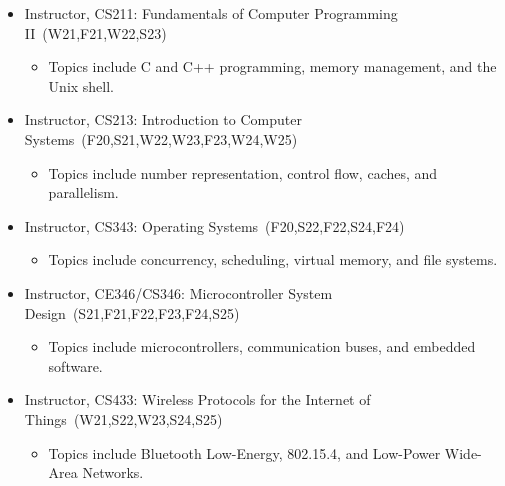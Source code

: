 \documentclass{article}
\begin{document}
\begin{itemize}
  \item[] Instructor, CS211: Fundamentals of Computer Programming II~(W21,F21,W22,S23)
    \vspace{-\topsep}
    \vspace{\itemsep}
    \begin{itemize}
      \item Topics include C and C++ programming, memory management, and the Unix shell.
    \end{itemize}
  \item[] Instructor, CS213: Introduction to Computer Systems~(F20,S21,W22,W23,F23,W24,W25)
    \vspace{-\topsep}
    \vspace{\itemsep}
    \begin{itemize}
      \item Topics include number representation, control flow, caches, and parallelism.
    \end{itemize}
  \item[] Instructor, CS343: Operating Systems~(F20,S22,F22,S24,F24)
    \vspace{-\topsep}
    \vspace{\itemsep}
    \begin{itemize}
      \item Topics include concurrency, scheduling, virtual memory, and file systems.
    \end{itemize}
  \item[] Instructor, CE346/CS346: Microcontroller System Design~(S21,F21,F22,F23,F24,S25)
    \vspace{-\topsep}
    \vspace{\itemsep}
    \begin{itemize}
      \item Topics include microcontrollers, communication buses, and embedded software.
    \end{itemize}
  \item[] Instructor, CS433: Wireless Protocols for the Internet of Things~(W21,S22,W23,S24,S25)
    \vspace{-\topsep}
    \vspace{\itemsep}
    \begin{itemize}
      \item Topics include Bluetooth Low-Energy, 802.15.4, and Low-Power Wide-Area Networks.
    \end{itemize}
\end{itemize}
\end{document}
